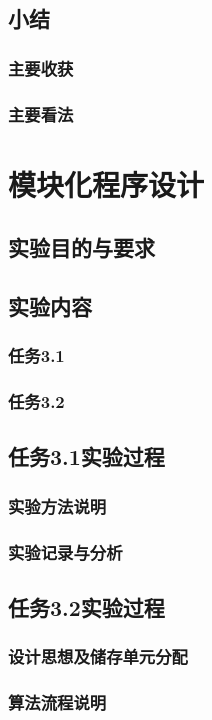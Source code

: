 \documentclass{ctexrep}
\begin{document}
\section{小结}
\subsection{主要收获}
\subsection{主要看法}


\chapter{模块化程序设计}
\section{实验目的与要求}
\section{实验内容}
\subsection{任务3.1}
\subsection{任务3.2}
\section{任务3.1实验过程}
\subsection{实验方法说明}
\subsection{实验记录与分析}
\section{任务3.2实验过程}
\subsection{设计思想及储存单元分配}
\subsection{算法流程说明}
\end{document}
